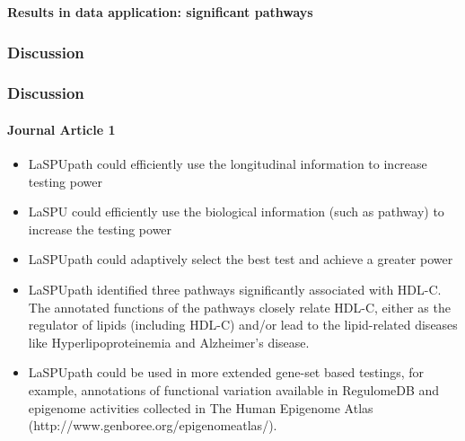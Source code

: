 \documentclass[compress]{beamer}
\begin{document}
\begin{frame}[allowframebreaks]
\framebreak
\textbf{Results in data application: significant pathways}
\tiny
{}
\end{frame}



\subsubsection{Discussion}
\begin{frame}[allowframebreaks]
\footnotesize
\frametitle{Discussion}
\framesubtitle{Journal Article 1}
\begin{itemize}
\item LaSPUpath could efficiently use the longitudinal information to increase testing power
\item LaSPU could efficiently use the biological information (such as pathway) to increase the testing power
\item LaSPUpath could adaptively select the best test and achieve a greater power
\item LaSPUpath identified three pathways significantly associated with HDL-C. The annotated functions of the pathways closely relate HDL-C, either as the regulator of lipids (including HDL-C) and/or lead to the lipid-related diseases like Hyperlipoproteinemia and Alzheimer's disease.
\item LaSPUpath could be used in more extended gene-set based testings, for example, annotations of functional variation available in RegulomeDB\cite{Boyle2012} and epigenome activities collected in The Human Epigenome Atlas (http://www.genboree.org/epigenomeatlas/).
\end{itemize}
\end{frame}
\end{document}
